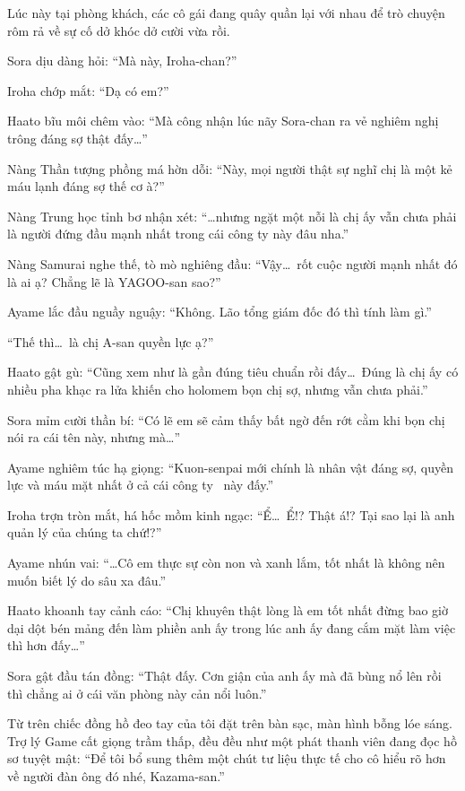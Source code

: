 \documentclass[../main.tex]{subfiles}
\begin{document}
\ct

Lúc này tại phòng khách, các cô gái đang quây quần lại với nhau để trò chuyện rôm rả về sự cố dở khóc dở cười vừa rồi.

Sora dịu dàng hỏi: ``Mà này, Iroha-chan?''

Iroha chớp mắt: ``Dạ có em?''

Haato bĩu môi chêm vào: ``Mà công nhận lúc nãy Sora-chan ra vẻ nghiêm nghị trông đáng sợ thật đấy\dots''

Nàng Thần tượng phồng má hờn dỗi: ``Này, mọi người thật sự nghĩ chị là một kẻ máu lạnh đáng sợ thế cơ à?''

Nàng Trung học tỉnh bơ nhận xét: ``\dots nhưng ngặt một nỗi là chị ấy vẫn chưa phải là người đứng đầu mạnh nhất trong cái công ty này đâu nha.''

Nàng Samurai nghe thế, tò mò nghiêng đầu: ``Vậy\dots\ rốt cuộc người mạnh nhất đó là ai ạ? Chẳng lẽ là YAGOO-san sao?''

Ayame lắc đầu nguầy nguậy: ``Không. Lão tổng giám đốc đó thì tính làm gì.''

``Thế thì\dots\ là chị A-san quyền lực ạ?''

Haato gật gù: ``Cũng xem như là gần đúng tiêu chuẩn rồi đấy\dots\ Đúng là chị ấy có nhiều pha khạc ra lửa khiến cho holomem bọn chị sợ, nhưng vẫn chưa phải.''

Sora mỉm cười thần bí: ``Có lẽ em sẽ cảm thấy bất ngờ đến rớt cằm khi bọn chị nói ra cái tên này, nhưng mà\dots''

Ayame nghiêm túc hạ giọng: ``Kuon-senpai mới chính là nhân vật đáng sợ, quyền lực và máu mặt nhất ở cả cái công ty \hll\ này đấy.''

Iroha trợn tròn mắt, há hốc mồm kinh ngạc: ``Ể\dots\ Ể!? Thật á!? Tại sao lại là anh quản lý của chúng ta chứ!?''

Ayame nhún vai: ``\dots Cô em thực sự còn non và xanh lắm, tốt nhất là không nên muốn biết lý do sâu xa đâu.''

Haato khoanh tay cảnh cáo: ``Chị khuyên thật lòng là em tốt nhất đừng bao giờ dại dột bén mảng đến làm phiền anh ấy trong lúc anh ấy đang cắm mặt làm việc thì hơn đấy\dots''

Sora gật đầu tán đồng: ``Thật đấy. Cơn giận của anh ấy mà đã bùng nổ lên rồi thì chẳng ai ở cái văn phòng này cản nổi luôn.''

Từ trên chiếc đồng hồ đeo tay của tôi đặt trên bàn sạc, màn hình bỗng lóe sáng. Trợ lý Game cất giọng trầm thấp, đều đều như một phát thanh viên đang đọc hồ sơ tuyệt mật: ``Để tôi bổ sung thêm một chút tư liệu thực tế cho cô hiểu rõ hơn về người đàn ông đó nhé, Kazama-san.''
\end{document}
